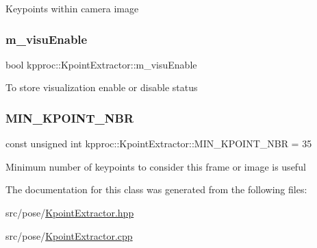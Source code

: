 Keypoints within camera image \mbox{\label{classkpproc_1_1KpointExtractor_ab0f534203a246814b163aa3dffeef1b5}} 
\subsubsection{\texorpdfstring{m\+\_\+visu\+Enable}{m\_visuEnable}}
{\footnotesize\ttfamily bool kpproc\+::\+Kpoint\+Extractor\+::m\+\_\+visu\+Enable\hspace{0.3cm}{\ttfamily [private]}}

To store visualization enable or disable status \mbox{\label{classkpproc_1_1KpointExtractor_a1d7c3437fc6b2cff35d60df9f554dd12}} 
\subsubsection{\texorpdfstring{M\+I\+N\+\_\+\+K\+P\+O\+I\+N\+T\+\_\+\+N\+BR}{MIN\_KPOINT\_NBR}}
{\footnotesize\ttfamily const unsigned int kpproc\+::\+Kpoint\+Extractor\+::\+M\+I\+N\+\_\+\+K\+P\+O\+I\+N\+T\+\_\+\+N\+BR = 35\hspace{0.3cm}{\ttfamily [static]}}

Minimum number of keypoints to consider this frame or image is useful 

The documentation for this class was generated from the following files\+:\begin{DoxyCompactItemize}
\item 
src/pose/\hyperlink{KpointExtractor_8hpp}{Kpoint\+Extractor.\+hpp}\item 
src/pose/\hyperlink{KpointExtractor_8cpp}{Kpoint\+Extractor.\+cpp}\end{DoxyCompactItemize}
